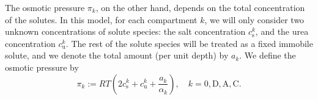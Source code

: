 \documentclass{article}
\begin{document}
The osmotic pressure $\pi_k$, on the other hand, depends on the total concentration of the solutes.
In this model, for each compartment $k$, we will only consider two unknown concentrations of solute species: the salt concentration $c_\mathrm{s}^k$, and the urea concentration $c_\mathrm{u}^k$.
The rest of the solute species will be treated as a fixed immobile solute, and we denote the total amount (per unit depth) by $a_k$.
We define the osmotic pressure by
\begin{equation}
    \pi_k:= RT\left( 2c_\mathrm{s}^k+c_{\mathrm{u}}^k+\frac{a_k}{\alpha_k} \right),\quad k=0,\mathrm{D},\mathrm{A},\mathrm{C}.
\end{equation}
\end{document}
